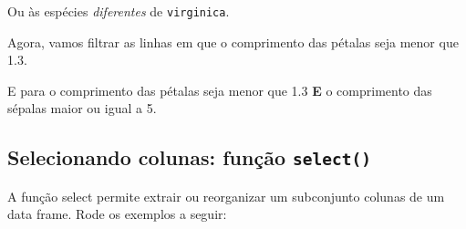 \documentclass[
]{book}
\newenvironment{Shaded}{\begin{snugshade}}{\end{snugshade}}
\newcommand{\DecValTok}[1]{\textcolor[rgb]{0.00,0.00,0.81}{#1}}
\newcommand{\FloatTok}[1]{\textcolor[rgb]{0.00,0.00,0.81}{#1}}
\newcommand{\KeywordTok}[1]{\textcolor[rgb]{0.13,0.29,0.53}{\textbf{#1}}}
\newcommand{\NormalTok}[1]{#1}
\newcommand{\OperatorTok}[1]{\textcolor[rgb]{0.81,0.36,0.00}{\textbf{#1}}}
\newcommand{\StringTok}[1]{\textcolor[rgb]{0.31,0.60,0.02}{#1}}
\begin{document}
Ou às espécies \emph{diferentes} de \texttt{virginica}.

\begin{Shaded}
\end{Shaded}

Agora, vamos filtrar as linhas em que o comprimento das pétalas seja menor que 1.3.

\begin{Shaded}
\end{Shaded}

E para o comprimento das pétalas seja menor que 1.3 \textbf{E} o comprimento das sépalas maior ou igual a 5.

\begin{Shaded}
\end{Shaded}

\hypertarget{selecionando-colunas-funuxe7uxe3o-select}{%
\subsection{\texorpdfstring{Selecionando colunas: função \texttt{select()}}{Selecionando colunas: função select()}}\label{selecionando-colunas-funuxe7uxe3o-select}}

A função select permite extrair ou reorganizar um subconjunto colunas de um data frame. Rode os exemplos a seguir:

\begin{Shaded}
\end{Shaded}
\end{document}
